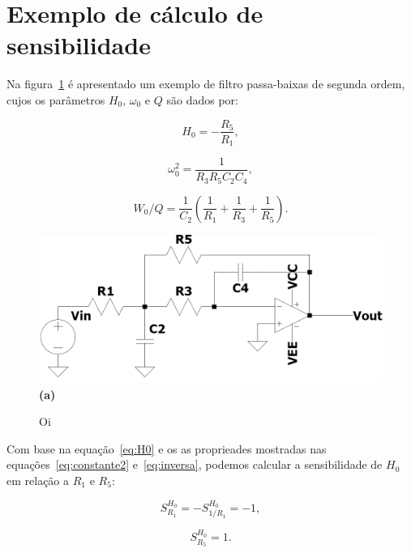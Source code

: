 \section{Exemplo de cálculo de sensibilidade}

Na figura~\ref{fig:MFB} é apresentado um exemplo de filtro passa-baixas de segunda ordem, cujos os parâmetros $H_0$, $\omega_0$  e $Q$ são dados por:

\begin{equation}
    H_0 = -\frac{R_5}{R_1},
    \label{eq:H0}
\end{equation}

\begin{equation}
    \omega_0^2 = \frac{1}{R_3 R_5 C_2 C_4},
    \label{eq:omega0}
\end{equation}

\begin{equation}
    W_0/Q = \frac{1}{C_2} (\frac{1}{R_1} + \frac{1}{R_3}  + \frac{1}{R_5} ).
    \label{eq:Q}
\end{equation}

\begin{figure}[h!]
    \centering
    \begin{minipage}[b]{0.9\linewidth}
        \includegraphics[width=\linewidth]{figuras/MFB.png}
        \centering
        \\ \textbf{(a)}
    \end{minipage}
    \caption{Oi}
    \label{fig:MFB}
\end{figure}

Com base na equação~\ref{eq:H0} e os as proprieades mostradas nas equações~\ref{eq:constante2} e~\ref{eq:inversa}, podemos calcular a sensibilidade de $H_0$ em relação a $R_1$ e $R_5$:	

\begin{equation}
    S^{H_0}_{R_1} = - S^{H_0}_{1/R_1} = -1,
\end{equation}

\begin{equation}
    S^{H_0}_{R_5} = 1.
\end{equation}

